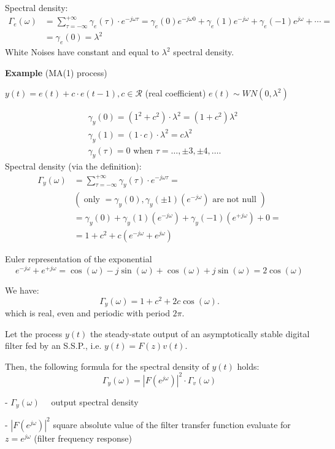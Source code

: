 Spectral density:
$$
\begin{aligned}
	\Gamma_{e}(\omega) &=\sum_{\tau=-\infty}^{+\infty} \gamma_{e}(\tau) \cdot e^{-j \omega \tau}=\gamma_{e}(0) e^{-j \omega 0}+\gamma_{e}(1) e^{-j \omega}+\gamma_{e}(-1) e^{j \omega}+\cdots=\\
	&=\gamma_{e}(0)=\lambda^{2}
\end{aligned}
$$
White Noises have constant and equal to $\lambda^{2}$ spectral density.

\textbf{Example} (MA(1) process)

$y(t)=e(t)+c \cdot e(t-1), c \in \mathcal{R}$ (real coefficient)
$e(t)\sim W N(0,\lambda^{2} )$

\begin{align*}
	&\gamma_{y}(0)=\left(1^{2}+c^{2}\right) \cdot \lambda^{2}=(1+c^{2})\lambda^{2}\\
	&\gamma_{y}(1)=(1 \cdot c) \cdot \lambda^{2}=c\lambda^{2} \\
	&\gamma_{y}(\tau)=0 \text { when } \tau=\ldots, \pm 3, \pm 4, \ldots .
\end{align*}
Spectral density (via the definition):
\begin{align*}
	\Gamma_{y}(\omega)&=\sum_{\tau=-\infty}^{+\infty} \gamma_{y}(\tau) \cdot e^{-j \omega \tau}= \\
	&\left(\text { only }=\gamma_{y}(0), \gamma_{y}(\pm 1)\left(e^{-j \omega}\right) \text { are not null }\right) \\
	&=\gamma_{y}(0)+\gamma_{y}(1)\left(e^{-j \omega}\right)+\gamma_{y}(-1)\left(e^{+j \omega}\right)+0= \\
	&=1+c^{2}+c\left(e^{-j \omega}+e^{j \omega}\right)
\end{align*}

Euler representation of the exponential
$$
e^{-j \omega}+e^{+j \omega}=\cos (\omega)-j \sin (\omega)+\cos (\omega)+j \sin (\omega)=2 \cos (\omega)
$$

We have:
$$\Gamma_y(\omega)=1+c^{2}+2 c \cos (\omega).$$
which is real, even and periodic with period $2 \pi$.

Let the process $y(t)$ the steady-state output of an asymptotically stable digital filter fed by an S.S.P., i.e. $y(t)=F(z) v(t)$.

Then, the following formula for the spectral density of $y(t)$ holds:
$$\Gamma_{y}(\omega)=|F\left(e^{j \omega}\right)|^{2} \cdot \Gamma_{v}(\omega)$$

- $\Gamma_{y}(\omega) \quad$ output spectral density

- $\left|F\left(e^{j \omega}\right)\right|^{2}$ square absolute value of the filter transfer function evaluate for $z=e^{j \omega}$ (filter frequency response)

